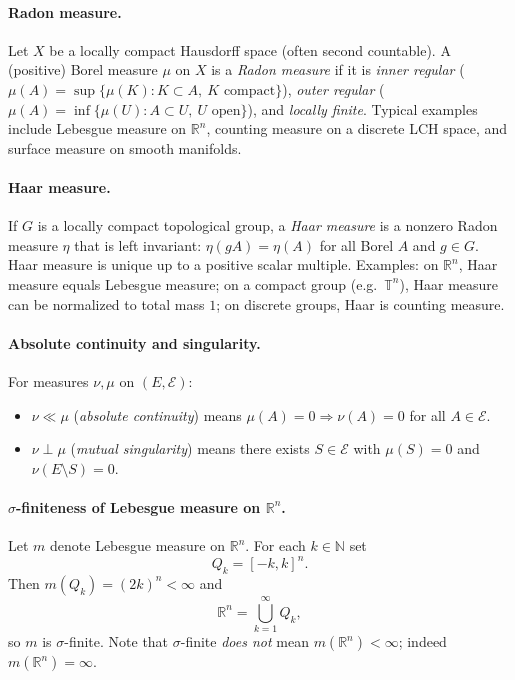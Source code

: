 \documentclass[12pt,a4paper]{article}
\theoremstyle{plain}
\theoremstyle{definition}
\theoremstyle{remark}
\theoremstyle{remark}
\theoremstyle{definition}
\begin{document}
	\bigskip
	
	\paragraph{Radon measure.}
	Let $X$ be a locally compact Hausdorff space (often second countable).
	A (positive) Borel measure $\mu$ on $X$ is a \emph{Radon measure} if it is
	\emph{inner regular} ($\mu(A)=\sup\{\mu(K):K\subset A,~K\text{ compact}\}$),
	\emph{outer regular} ($\mu(A)=\inf\{\mu(U):A\subset U,~U\text{ open}\}$),
	and \emph{locally finite}. Typical examples include Lebesgue measure on
	$\mathbb R^n$, counting measure on a discrete LCH space, and surface measure on smooth manifolds.
	
	\bigskip
	
	\paragraph{Haar measure.}
	If $G$ is a locally compact topological group, a \emph{Haar measure} is a nonzero
	Radon measure $\eta$ that is left invariant: $\eta(gA)=\eta(A)$ for all Borel $A$ and $g\in G$.
	Haar measure is unique up to a positive scalar multiple.
	Examples: on $\mathbb R^n$, Haar measure equals Lebesgue measure; on a compact group
	(e.g.\ $\mathbb T^n$), Haar measure can be normalized to total mass $1$; on discrete groups, Haar is counting measure.
	
	\bigskip
	
	\paragraph{Absolute continuity and singularity.}
	For measures $\nu,\mu$ on $(E,\mathcal E)$:
	\begin{itemize}
		\item $\nu\ll\mu$ (\emph{absolute continuity}) means $\mu(A)=0\Rightarrow \nu(A)=0$ for all $A\in\mathcal E$.
		\item $\nu\perp\mu$ (\emph{mutual singularity}) means there exists $S\in\mathcal E$ with $\mu(S)=0$ and $\nu(E\setminus S)=0$.
	\end{itemize}
	
	
	\paragraph{$\sigma$-finiteness of Lebesgue measure on $\mathbb{R}^n$.}
	Let $m$ denote Lebesgue measure on $\mathbb{R}^n$. For each $k\in\mathbb{N}$ set
	\[
	Q_k=[-k,k]^n.
	\]
	Then $m(Q_k)=(2k)^n<\infty$ and
	\[
	\mathbb{R}^n=\bigcup_{k=1}^\infty Q_k,
	\]
	so $m$ is $\sigma$-finite. Note that $\sigma$-finite \emph{does not} mean $m(\mathbb{R}^n)<\infty$; indeed $m(\mathbb{R}^n)=\infty$.
	
\end{document}
